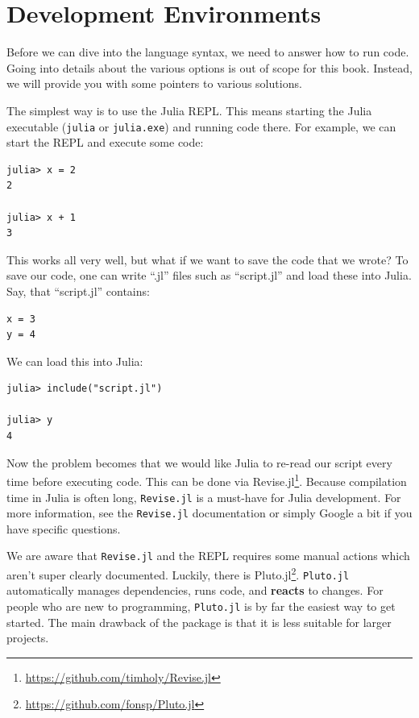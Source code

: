 \documentclass[
  notoc %
]{tufte-book}
\DeclareRobustCommand{\href}[2]{#2\footnote{\url{#1}}}
\newcommand{\passthrough}[1]{#1}
\begin{document}
\hypertarget{sec:ide}{%
\section{Development Environments}\label{sec:ide}}

Before we can dive into the language syntax, we need to answer how to
run code. Going into details about the various options is out of scope
for this book. Instead, we will provide you with some pointers to
various solutions.

The simplest way is to use the Julia REPL. This means starting the Julia
executable (\passthrough{\lstinline!julia!} or
\passthrough{\lstinline!julia.exe!}) and running code there. For
example, we can start the REPL and execute some code:

\begin{lstlisting}
julia> x = 2
2

julia> x + 1
3
\end{lstlisting}

This works all very well, but what if we want to save the code that we
wrote? To save our code, one can write ``.jl'' files such as
``script.jl'' and load these into Julia. Say, that ``script.jl''
contains:

\begin{lstlisting}
x = 3
y = 4
\end{lstlisting}

We can load this into Julia:

\begin{lstlisting}
julia> include("script.jl")

julia> y
4
\end{lstlisting}

Now the problem becomes that we would like Julia to re-read our script
every time before executing code. This can be done via
\href{https://github.com/timholy/Revise.jl}{Revise.jl}. Because
compilation time in Julia is often long,
\passthrough{\lstinline!Revise.jl!} is a must-have for Julia
development. For more information, see the
\passthrough{\lstinline!Revise.jl!} documentation or simply Google a bit
if you have specific questions.

We are aware that \passthrough{\lstinline!Revise.jl!} and the REPL
requires some manual actions which aren't super clearly documented.
Luckily, there is \href{https://github.com/fonsp/Pluto.jl}{Pluto.jl}.
\passthrough{\lstinline!Pluto.jl!} automatically manages dependencies,
runs code, and \textbf{reacts} to changes. For people who are new to
programming, \passthrough{\lstinline!Pluto.jl!} is by far the easiest
way to get started. The main drawback of the package is that it is less
suitable for larger projects.
\end{document}
